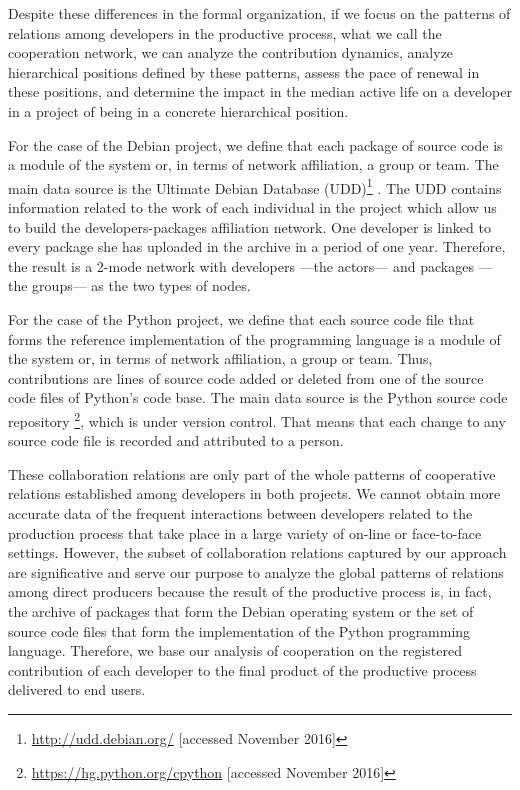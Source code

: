 Despite these differences in the formal organization, if we focus on the patterns of relations among developers in the productive process, what we call the cooperation network, we can analyze the contribution dynamics, analyze hierarchical positions defined by these patterns, assess the pace of renewal in these positions, and determine the impact in the median active life on a developer in a project of being in a concrete hierarchical position.

For the case of the Debian project, we define that each package of source code is a module of the system or, in terms of network affiliation, a group or team. The main data source is the Ultimate Debian Database (UDD)\footnote{\href{http://udd.debian.org/}{http://udd.debian.org/} [accessed November 2016]} \citep{udd:2010}. The UDD contains information related to the work of each individual in the project which allow us to build the developers-packages affiliation network. One developer is linked to every package she has uploaded in the archive in a period of one year. Therefore, the result is a 2-mode network with developers ---the actors--- and packages ---the groups--- as the two types of nodes.

For the case of the Python project, we define that each source code file that forms the reference implementation of the programming language is a module of the system or, in terms of network affiliation, a group or team. Thus, contributions are lines of source code added or deleted from one of the source code files of Python's code base. The main data source is the Python source code repository \footnote{\href{https://hg.python.org/cpython}{https://hg.python.org/cpython} [accessed November 2016]}, which is under version control. That means that each change to any source code file is recorded and attributed to a person.

These collaboration relations are only part of the whole patterns of cooperative relations established among developers in both projects. We cannot obtain more accurate data of the frequent interactions between developers related to the production process that take place in a large variety of on-line or face-to-face settings. However, the subset of collaboration relations captured by our approach are significative and serve our purpose to analyze the global patterns of relations among direct producers because the result of the productive process is, in fact, the archive of packages that form the Debian operating system or the set of source code files that form the implementation of the Python programming language. Therefore, we base our analysis of cooperation on the registered contribution of each developer to the final product of the productive process delivered to end users.

